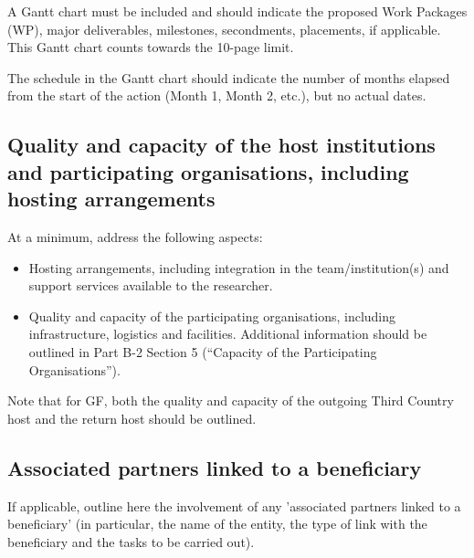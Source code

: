 \documentclass[12pt,draftproposal]{msca-pf}
\begin{document}
A Gantt chart must be included and should indicate the proposed Work Packages
(WP), major deliverables, milestones, secondments, placements, if applicable.
This Gantt chart counts towards the 10-page limit.

The schedule in the Gantt chart should indicate the number of months elapsed
from the start of the action (Month 1, Month 2, etc.), but no actual dates.

\subsection{Quality and capacity of the host institutions and participating
organisations, including hosting arrangements}
\label{ssc:implementation:host}

At a minimum, address the following aspects:

\begin{itemize}
    \item Hosting arrangements, including integration in the team/institution(s)
    and support services available to the researcher.

    \item Quality and capacity of the participating organisations, including
    infrastructure, logistics and facilities. Additional information should be
    outlined in Part B-2 Section 5 (``Capacity of the Participating Organisations'').
\end{itemize}

Note that for GF, both the quality and capacity of the outgoing Third Country
host and the return host should be outlined.

\subsection*{Associated partners linked to a beneficiary {\protect\footnotemark{}}}
\label{ssc:implementation:partners}

If applicable, outline here the involvement of any 'associated partners linked
to a beneficiary' (in particular, the name of the entity, the type of link with
the beneficiary and the tasks to be carried out).


   
\end{document}
